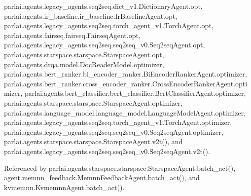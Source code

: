 parlai.\+agents.\+legacy\+\_\+agents.\+seq2seq.\+dict\+\_\+v1.\+Dictionary\+Agent.\+opt, parlai.\+agents.\+ir\+\_\+baseline.\+ir\+\_\+baseline.\+Ir\+Baseline\+Agent.\+opt, parlai.\+agents.\+legacy\+\_\+agents.\+seq2seq.\+torch\+\_\+agent\+\_\+v1.\+Torch\+Agent.\+opt, parlai.\+agents.\+fairseq.\+fairseq.\+Fairseq\+Agent.\+opt, parlai.\+agents.\+legacy\+\_\+agents.\+seq2seq.\+seq2seq\+\_\+v0.\+Seq2seq\+Agent.\+opt, parlai.\+agents.\+starspace.\+starspace.\+Starspace\+Agent.\+opt, parlai.\+agents.\+drqa.\+model.\+Doc\+Reader\+Model.\+optimizer, parlai.\+agents.\+bert\+\_\+ranker.\+bi\+\_\+encoder\+\_\+ranker.\+Bi\+Encoder\+Ranker\+Agent.\+optimizer, parlai.\+agents.\+bert\+\_\+ranker.\+cross\+\_\+encoder\+\_\+ranker.\+Cross\+Encoder\+Ranker\+Agent.\+optimizer, parlai.\+agents.\+bert\+\_\+classifier.\+bert\+\_\+classifier.\+Bert\+Classifier\+Agent.\+optimizer, parlai.\+agents.\+starspace.\+starspace.\+Starspace\+Agent.\+optimizer, parlai.\+agents.\+language\+\_\+model.\+language\+\_\+model.\+Language\+Model\+Agent.\+optimizer, parlai.\+agents.\+legacy\+\_\+agents.\+seq2seq.\+torch\+\_\+agent\+\_\+v1.\+Torch\+Agent.\+optimizer, parlai.\+agents.\+legacy\+\_\+agents.\+seq2seq.\+seq2seq\+\_\+v0.\+Seq2seq\+Agent.\+optimizer, parlai.\+agents.\+starspace.\+starspace.\+Starspace\+Agent.\+v2t(), and parlai.\+agents.\+legacy\+\_\+agents.\+seq2seq.\+seq2seq\+\_\+v0.\+Seq2seq\+Agent.\+v2t().



Referenced by parlai.\+agents.\+starspace.\+starspace.\+Starspace\+Agent.\+batch\+\_\+act(), agent.\+memnn\+\_\+feedback.\+Memnn\+Feedback\+Agent.\+batch\+\_\+act(), and kvmemnn.\+Kvmemnn\+Agent.\+batch\+\_\+act().

